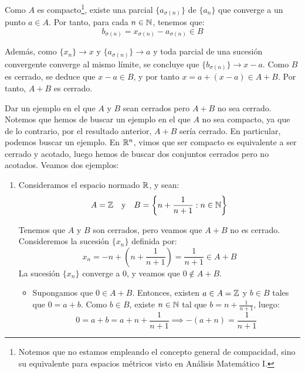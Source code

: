 \begin{ejercicio}
\begin{enumerate}[label={\alph*)}]
    Como $A$ es compacto\footnote{Notemos que no estamos empleando el concepto general de compacidad, sino su equivalente para espacios métricos visto en Análisis Matemático I.}, existe una parcial $\{a_{\sigma(n)}\}$ de $\{a_n\}$ que converge a un punto $a \in A$. Por tanto, para cada $n\in \mathbb{N}$, tenemos que:
    \begin{equation*}
        b_{\sigma(n)} = x_{\sigma(n)} - a_{\sigma(n)} \in B
    \end{equation*}

    Además, como $\{x_n\}\to x$ y $\{a_{\sigma(n)}\}\to a$ y toda parcial de una sucesión convergente converge al mismo límite, se concluye que $\{b_{\sigma(n)}\}\to x - a$. Como $B$ es cerrado, se deduce que $x - a \in B$, y por tanto $x = a + (x - a) \in A + B$. Por tanto, $A + B$ es cerrado.
\end{enumerate}
Dar un ejemplo en el que $A$ y $B$ sean cerrados pero $A + B$ no sea cerrado.\\


Notemos que hemos de buscar un ejemplo en el que $A$ no sea compacto, ya que de lo contrario, por el resultado anterior, $A + B$ sería cerrado. En particular, podemos buscar un ejemplo. En $\mathbb{R}^n$, vimos que ser compacto es equivalente a ser cerrado y acotado, luego hemos de buscar dos conjuntos cerrados pero no acotados. Veamos dos ejemplos:
\begin{enumerate}
    \item Consideramos el espacio normado $\mathbb{R}$, y sean:
    \begin{equation*}
        A = \mathbb{Z} \quad \text{y} \quad B = \left\{n + \frac{1}{n+1} : n \in \mathbb{N}\right\}
    \end{equation*}

    Tenemos que $A$ y $B$ son cerrados, pero veamos que $A + B$ no es cerrado. Consideremos la sucesión $\{x_n\}$ definida por:
    \begin{equation*}
        x_n = -n + \left(n + \frac{1}{n+1}\right) = \frac{1}{n+1} \in A + B
    \end{equation*}
    La sucesión $\{x_n\}$ converge a $0$, y veamos que $0 \notin A + B$.
    \begin{itemize}
        \item Supongamos que $0 \in A + B$. Entonces, existen $a \in A=\mathbb{Z}$ y $b \in B$ tales que $0 = a + b$. Como $b\in B$, existe $n \in \mathbb{N}$ tal que $b = n + \frac{1}{n+1}$, luego:
        \begin{equation*}
            0 = a + b = a + n + \frac{1}{n+1} \implies -(a + n) = \frac{1}{n+1}
        \end{equation*}


\end{itemize}
\end{enumerate}
\end{ejercicio}
